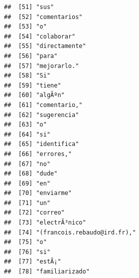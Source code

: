 \documentclass[
]{book}
\begin{document}
\begin{verbatim}
##  [51] "sus"                                                                              
##  [52] "comentarios"                                                                      
##  [53] "o"                                                                                
##  [54] "colaborar"                                                                        
##  [55] "directamente"                                                                     
##  [56] "para"                                                                             
##  [57] "mejorarlo."                                                                       
##  [58] "Si"                                                                               
##  [59] "tiene"                                                                            
##  [60] "algÃºn"                                                                           
##  [61] "comentario,"                                                                      
##  [62] "sugerencia"                                                                       
##  [63] "o"                                                                                
##  [64] "si"                                                                               
##  [65] "identifica"                                                                       
##  [66] "errores,"                                                                         
##  [67] "no"                                                                               
##  [68] "dude"                                                                             
##  [69] "en"                                                                               
##  [70] "enviarme"                                                                         
##  [71] "un"                                                                               
##  [72] "correo"                                                                           
##  [73] "electrÃ³nico"                                                                     
##  [74] "(francois.rebaudo@ird.fr),"                                                       
##  [75] "o"                                                                                
##  [76] "si"                                                                               
##  [77] "estÃ¡"                                                                            
##  [78] "familiarizado"                                                                    

\end{verbatim}
\end{document}
